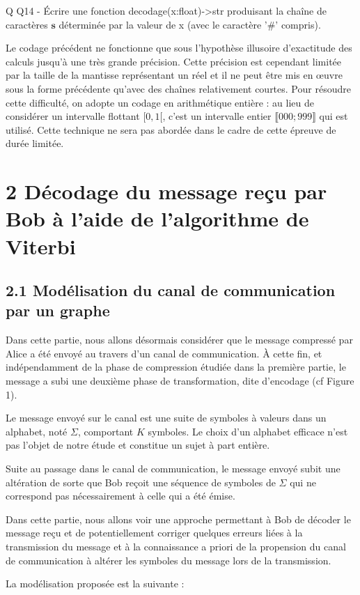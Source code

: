 \documentclass[10pt]{article}
\begin{document}
Q Q14 - Écrire une fonction decodage(x:float)->str produisant la chaîne de caractères $\mathbf{s}$ déterminée par la valeur de x (avec le caractère '\#' compris).

Le codage précédent ne fonctionne que sous l'hypothèse illusoire d'exactitude des calculs jusqu'à une très grande précision. Cette précision est cependant limitée par la taille de la mantisse représentant un réel et il ne peut être mis en œuvre sous la forme précédente qu'avec des chaînes relativement courtes. Pour résoudre cette difficulté, on adopte un codage en arithmétique entière : au lieu de considérer un intervalle flottant $[0,1[$, c'est un intervalle entier $\llbracket 000 ; 999 \rrbracket$ qui est utilisé. Cette technique ne sera pas abordée dans le cadre de cette épreuve de durée limitée.

\section*{2 Décodage du message reçu par Bob à l'aide de l'algorithme de Viterbi}
\subsection*{2.1 Modélisation du canal de communication par un graphe}
Dans cette partie, nous allons désormais considérer que le message compressé par Alice a été envoyé au travers d'un canal de communication. À cette fin, et indépendamment de la phase de compression étudiée dans la première partie, le message a subi une deuxième phase de transformation, dite d'encodage (cf Figure 1).

Le message envoyé sur le canal est une suite de symboles à valeurs dans un alphabet, noté $\Sigma$, comportant $K$ symboles. Le choix d'un alphabet efficace n'est pas l'objet de notre étude et constitue un sujet à part entière.

Suite au passage dans le canal de communication, le message envoyé subit une altération de sorte que Bob reçoit une séquence de symboles de $\Sigma$ qui ne correspond pas nécessairement à celle qui a été émise.

Dans cette partie, nous allons voir une approche permettant à Bob de décoder le message reçu et de potentiellement corriger quelques erreurs liées à la transmission du message et à la connaissance a priori de la propension du canal de communication à altérer les symboles du message lors de la transmission.

La modélisation proposée est la suivante :
\end{document}

